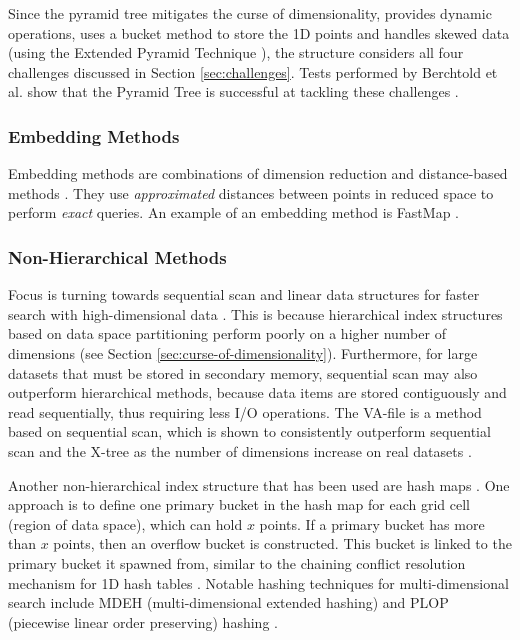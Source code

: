 Since the pyramid tree mitigates the curse of dimensionality, provides dynamic operations, uses a bucket method to store the 1D points and handles skewed data (using the Extended Pyramid Technique \cite{pyramid-tree}), the structure considers all four challenges discussed in Section \ref{sec:challenges}. Tests performed by Berchtold et al. show that the Pyramid Tree is successful at tackling these challenges \cite{pyramid-tree}.

\subsubsection{Embedding Methods}

Embedding methods are combinations of dimension reduction and distance-based methods \cite{md-structures-samet}. They use \textit{approximated} distances between points in reduced space to perform \textit{exact} queries. An example of an embedding method is FastMap \cite{fast-map}.

\subsubsection{Non-Hierarchical Methods}

Focus is turning towards sequential scan and linear data structures for faster search with high-dimensional data \cite{md-structures-samet, va-file}. This is because hierarchical index structures based on data space partitioning perform poorly on a higher number of dimensions (see Section \ref{sec:curse-of-dimensionality}). Furthermore, for large datasets that must be stored in secondary memory, sequential scan may also outperform hierarchical methods, because data items are stored contiguously and read sequentially, thus requiring less I/O operations. The VA-file is a method based on sequential scan, which is shown to consistently outperform sequential scan and the X-tree as the number of dimensions increase on real datasets \cite{va-file}.

Another non-hierarchical index structure that has been used are hash maps \cite{md-structures-samet}. One approach is to define one primary bucket in the hash map for each grid cell (region of data space), which can hold $x$ points. If a primary bucket has more than $x$ points, then an overflow bucket is constructed. This bucket is linked to the primary bucket it spawned from, similar to the chaining conflict resolution mechanism for 1D hash tables \cite{introduction-to-algorithms}. Notable hashing techniques for multi-dimensional search include MDEH (multi-dimensional extended hashing) and PLOP (piecewise linear order preserving) hashing \cite{md-structures-samet}.


